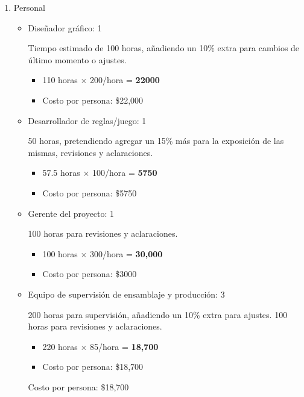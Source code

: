 \documentclass[12pt]{article}
\begin{document}
    \begin{enumerate}
	\item Personal

	\begin{itemize}
		\item Diseñador gráfico: 1 

        Tiempo estimado de 100 horas, añadiendo un 10\% extra para cambios de último momento o ajustes.
        \begin{itemize}
            \item 110 horas $\times$ 200/hora = \textbf{22000}
            \item Costo por persona: \$22,000
        \end{itemize}	

     
		\item Desarrollador de reglas/juego: 1

           50 horas, pretendiendo agregar un 15\% más para la exposición de las mismas, revisiones y aclaraciones.
            \begin{itemize}
            \item 57.5 horas $\times$ 100/hora = \textbf{5750}
            \item Costo por persona: \$5750
            \end{itemize}	

		\item Gerente del proyecto: 1

            100 horas para revisiones y aclaraciones.
            \begin{itemize}
            \item 100 horas $\times$ 300/hora = \textbf{30,000}
            \item Costo por persona: \$3000
            \end{itemize}	

		\item Equipo de supervisión de ensamblaje y producción:  3

          200 horas para supervisión, añadiendo un 10\% extra para ajustes.
           100 horas para revisiones y aclaraciones.
            \begin{itemize}
            \item 220 horas $\times$ 85/hora = \textbf{18,700}
            \item Costo por persona: \$18,700
            \end{itemize}	

		Costo por persona: \$18,700


\end{itemize}
\end{enumerate}
\end{document}
